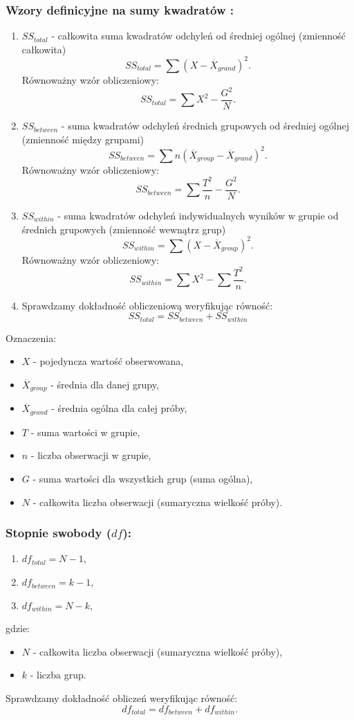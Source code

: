 \documentclass[12pt,a4paper]{article}
\begin{document}
\subsubsection{Wzory definicyjne na sumy kwadratów \cite{witte2010statistics}:}
\begin{enumerate}
    \item $SS_{total}$ - całkowita suma kwadratów odchyleń od średniej ogólnej (zmienność całkowita)
    $$SS_{total}=\sum(X-\overline{X}_{grand})^2.$$
    Równoważny wzór obliczeniowy:
    $$SS_{total}=\sum X^2-\frac{G^2}{N}.$$
    \item $SS_{between}$ - suma kwadratów odchyleń średnich grupowych od średniej ogólnej (zmienność między grupami)
    $$SS_{between}=\sum n(\overline{X}_{group}-\overline{X}_{grand})^2.$$
    Równoważny wzór obliczeniowy:
    $$SS_{between}=\sum \frac{T^2}{n}-\frac{G^2}{N}.$$
    \item $SS_{within}$ - suma kwadratów odchyleń indywidualnych wyników w grupie od średnich grupowych (zmienność wewnątrz grup)
    $$SS_{within}=\sum(X-\overline{X}_{group})^2.$$
    Równoważny wzór obliczeniowy:
    $$SS_{within}=\sum X^2-\sum\frac{T^2}{n}.$$
    \item Sprawdzamy dokładność obliczeniową weryfikując równość:
    $$SS_{total}=SS_{between}+SS_{within}$$
\end{enumerate}
Oznaczenia:
\begin{itemize}
    \item $X$ - pojedyncza wartość obserwowana,
    \item $\overline{X}_{group}$ - średnia dla danej grupy,
    \item $\overline{X}_{grand}$ - średnia ogólna dla całej próby,
    \item $T$ - suma wartości w grupie,
    \item $n$ - liczba obserwacji w grupie,
    \item $G$ - suma wartości dla wszystkich grup (suma ogólna),
    \item $N$ - całkowita liczba obserwacji (sumaryczna wielkość próby). 
\end{itemize}

\newpage
\subsubsection{Stopnie swobody ($df$):}
\begin{enumerate}
    \item $df_{total}=N-1$,
    \item $df_{between}=k-1$,
    \item $df_{within}=N-k$,
\end{enumerate}
gdzie:
\begin{itemize}
    \item $N$ - całkowita liczba obserwacji (sumaryczna wielkość próby),
    \item $k$ - liczba grup.
\end{itemize}
\vspace{2mm}
Sprawdzamy dokładność obliczeń weryfikując równość:
$$df_{total}=df_{between}+df_{within}.$$
\end{document}
